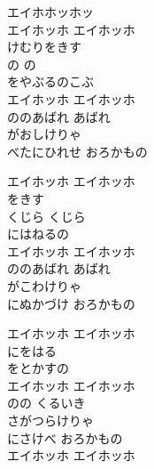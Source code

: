 \documentclass[10pt,b5j]{tarticle} %
\begin{document}
\vspace{1.5em} %
\newcommand{\linespace}{0.5em} %
\newcommand{\blocksize}{0.5\hsize} %
\begin{enumerate} %
    \begin{minipage}[c]{\blocksize}
    
        \vspace{\linespace}
        \item
        エイホホッホッ\\
        エイホッホ エイホッホ\\
        けむりをきす\\
        の の\\
        をやぶるのこぶ\\
        エイホッホ エイホッホ\\
        ののあばれ あばれ\\
        がおしけりゃ\\
        べたにひれせ おろかもの
        
        \vspace{\linespace}
        \item
        エイホッホ エイホッホ\\
        をきす\\
        くじら くじら\\
        にはねるの\\
        エイホッホ エイホッホ\\
        ののあばれ あばれ\\
        がこわけりゃ\\
        にぬかづけ おろかもの
        
        \vspace{\linespace}
        \item
        エイホッホ エイホッホ\\
        にをはる \\
        をとかすの\\
        エイホッホ エイホッホ\\
        のの くるいき\\
        さがつらけりゃ\\
        にさけべ おろかもの\\
        エイホッホ エイホッホ
    
    \end{minipage}
\end{enumerate} %
\end{document}

